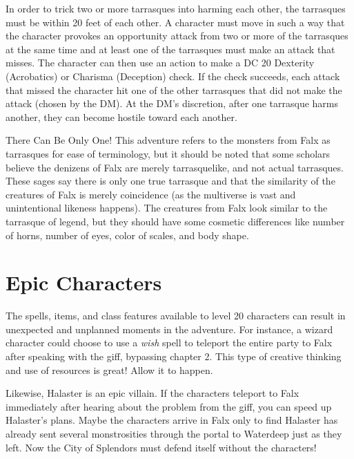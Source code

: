 \documentclass[10pt,a4paper,twoside,bg=print,twocolumn,openany,nodeprecatedcode]{dndbook}
\begin{document}
In order to trick two or more tarrasques into harming each other, the tarrasques must be within 20 feet of each other. A character must move in such a way that the character provokes an opportunity attack from two or more of the tarrasques at the same time and at least one of the tarrasques must make an attack that misses. The character can then use an action to make a DC 20 Dexterity (Acrobatics) or Charisma (Deception) check. If the check succeeds, each attack that missed the character hit one of the other tarrasques that did not make the attack (chosen by the DM). At the DM's discretion, after one tarrasque harms another, they can become hostile toward each another.

\begin{DndSidebar}[float=!b]{There Can Be Only One!}
This adventure refers to the monsters from Falx as tarrasques for ease of terminology, but it should be noted that some scholars believe the denizens of Falx are merely tarrasquelike, and not actual tarrasques. These sages say there is only one true tarrasque and that the similarity of the creatures of Falx is merely coincidence (as the multiverse is vast and  unintentional likeness happens). The creatures from Falx look similar to the tarrasque of legend, but they should have some cosmetic differences like number of horns, number of eyes, color of scales, and body shape.



\end{DndSidebar}

\section{Epic Characters}
The spells, items, and class features available to level 20 characters can result in unexpected and unplanned moments in the adventure. For instance, a wizard character could choose to use a \textit{wish} spell to teleport the entire party to Falx after speaking with the giff, bypassing chapter 2. This type of creative thinking and use of resources is great! Allow it to happen.

Likewise, Halaster is an epic villain. If the characters teleport to Falx immediately after hearing about the problem from the giff, you can speed up Halaster's plans. Maybe the characters arrive in Falx only to find Halaster has already sent several monstrosities through the portal to Waterdeep just as they left. Now the City of Splendors must defend itself without the characters!
\end{document}
